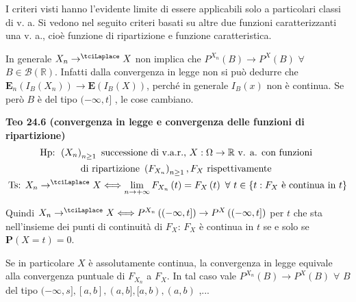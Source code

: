 \documentclass{article}
\begin{document}
I criteri visti hanno l'evidente limite di essere applicabili solo a
particolari classi di v. a. Si vedono nel seguito criteri basati su altre
due funzioni caratterizzanti una v. a., cio\`{e} funzione di ripartizione e
funzione caratteristica.

In generale $X_{n}\rightarrow ^{\tciLaplace }X$ non implica che $%
P^{X_{n}}\left( B\right) \rightarrow P^{X}\left( B\right) $ $\forall $ $B\in 
\mathcal{B}\left( 
\mathbb{R}
\right) $. Infatti dalla convergenza in legge non si pu\`{o} dedurre che $%
\mathbf{E}_{n}\left( I_{B}\left( X_{n}\right) \right) \rightarrow \mathbf{E}%
\left( I_{B}\left( X\right) \right) $, perch\'{e} in generale $I_{B}\left(
x\right) $ non \`{e} continua. Se per\`{o} $B$ \`{e} del tipo $(-\infty ,t]$%
, le cose cambiano.

\textbf{Teo 24.6 (convergenza in legge e convergenza delle funzioni di
ripartizione)} 
\begin{gather*}
\text{Hp}\text{: }\left( X_{n}\right) _{n\geq 1}\text{ successione di
v.a.r., }X:\Omega \rightarrow 
\mathbb{R}
\text{ v. a. con funzioni } \\
\text{di ripartizione }\left( F_{X_{n}}\right) _{n\geq 1},F_{X}\text{
rispettivamente } \\
\text{Ts}\text{: }X_{n}\rightarrow ^{\tciLaplace }X\Longleftrightarrow
\lim_{n\rightarrow +\infty }F_{X_{n}}\left( t\right) =F_{X}\left( t\right) 
\text{ }\forall \text{ }t\in \left\{ t:F_{X}\text{ \`{e} continua in }%
t\right\}
\end{gather*}

Quindi $X_{n}\rightarrow ^{\tciLaplace }X\Longleftrightarrow P^{X_{n}}\left(
(-\infty ,t]\right) \rightarrow P^{X}\left( (-\infty ,t]\right) $ per $t$
che sta nell'insieme dei punti di continuit\`{a} di $F_{X}$: $F_{X}$ \`{e}
continua in $t$ se e solo se $\mathbf{P}\left( X=t\right) =0$.

Se in particolare $X$ \`{e} assolutamente continua, la convergenza in legge
equivale alla convergenza puntuale di $F_{X_{n}}$ a $F_{X}$. In tal caso
vale $P^{X_{n}}\left( B\right) \rightarrow P^{X}\left( B\right) $ $\forall $ 
$B$ del tipo $(-\infty ,s],\left[ a,b\right] ,(a,b],[a,b),\left( a,b\right) $%
,...
\end{document}
